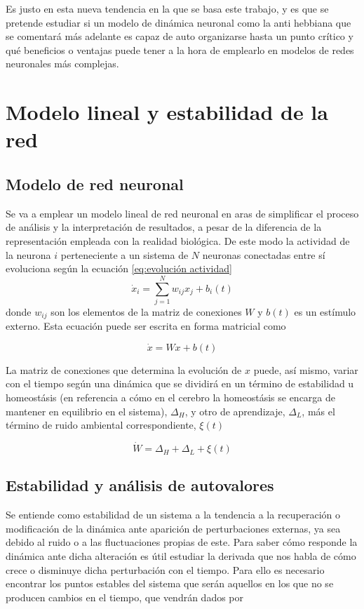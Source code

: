 \documentclass[11pt,a4paper,twoside,pdf]{article}
\begin{document}
Es justo en esta nueva tendencia en la que se basa este trabajo, y es que se pretende estudiar si un modelo de dinámica neuronal como la anti hebbiana que se comentará más adelante es capaz de auto organizarse hasta un punto crítico y qué beneficios o ventajas puede tener a la hora de emplearlo en modelos de redes neuronales más complejas.

\section{Modelo lineal y estabilidad de la red}
\subsection{Modelo de red neuronal}
Se va a emplear un modelo lineal de red neuronal en aras de simplificar el proceso de análisis y la interpretación de resultados, a pesar de la diferencia de la representación empleada con la realidad biológica. De este modo la actividad de la neurona \(i\) perteneciente a un sistema de \(N\) neuronas conectadas entre sí evoluciona según la ecuación \eqref{eq:evolución actividad}
\begin{equation}
  \dot{x}_i = \sum_{j=1}^N w_{ij}x_j + b_i(t)
\end{equation}
donde \(w_{ij}\) son los elementos de la matriz de conexiones \(W\) y \(b(t)\) es un estímulo externo. Esta ecuación puede ser escrita en forma matricial como 

\begin{equation}
  \dot{x} = Wx + b(t)
  \label{eq:evolución actividad}
\end{equation}

La matriz de conexiones que determina la evolución de \(x\) puede, así mismo, variar con el tiempo según una dinámica que se dividirá en un término de estabilidad u homeostásis (en referencia a cómo en el cerebro la homeostásis se encarga de mantener en equilibrio en el sistema), \(\Delta_H\), y otro de aprendizaje, \(\Delta_L\), más el término de ruido ambiental correspondiente, \(\xi (t)\)

\begin{equation}
  \dot{W} = \Delta_H + \Delta_L + \xi (t)
  \label{eq:evolución conexiones}
\end{equation}

\subsection{Estabilidad y análisis de autovalores}
Se entiende como estabilidad de un sistema a la tendencia a la recuperación o modificación de la dinámica ante aparición de perturbaciones externas, ya sea debido al ruido o a las fluctuaciones propias de este. Para saber cómo responde la dinámica ante dicha alteración es útil estudiar la derivada que nos habla de cómo crece o disminuye dicha perturbación con el tiempo. Para ello es necesario encontrar los puntos estables del sistema que serán aquellos en los que no se producen cambios en el tiempo, que vendrán dados por
\end{document}
